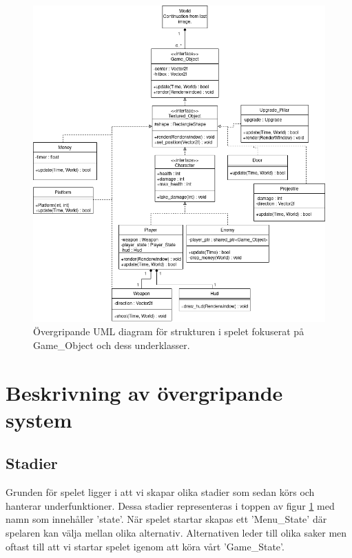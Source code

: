 \documentclass{TDP005mall}
\begin{document}
\begin{figure}[H]
         \begin{center}
             \includegraphics[width=15cm]{Graphic/overview_part2.png}
             \caption{\label{fig:1} Övergripande UML diagram för strukturen i spelet fokuserat på Game\_Object och dess underklasser.}
         \end{center}
\end{figure}
\pagebreak
\section{Beskrivning av övergripande system}

\subsection{Stadier}
Grunden för spelet ligger i att vi skapar olika stadier som sedan körs och hanterar underfunktioner. Dessa stadier representeras i toppen av figur \ref{fig:1} med namn som innehåller 'state'. När spelet startar skapas ett 'Menu\_State' där spelaren kan välja mellan olika alternativ. Alternativen leder till olika saker men oftast till att vi startar spelet igenom att köra vårt 'Game\_State'. 
\end{document}
